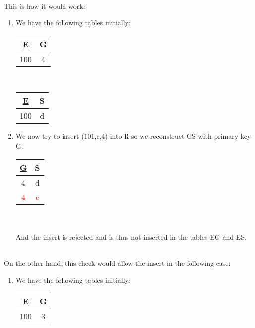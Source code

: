 \documentclass[11pt]{article}
\begin{document}
\begin{enumerate}
    \\ This is how it would work:
    \begin{enumerate}
        \item We have the following tables initially:
        \\
        \begin{tabular}{|c|c|} 
            \hline
            \underline{E} & G \\
            \hline
            100 & 4 \\ 
            \hline
        \end{tabular}
        \ \ \ \ \ \ \ \ \ \ \ \ \ \ \ \ 
        \begin{tabular}{|c|c|} 
            \hline
            \underline{E} & S \\
            \hline
            100 & d \\ 
            \hline
        \end{tabular}
        \item We now try to insert (101,c,4) into R so we reconstruct GS with primary key G.
        \\
        \begin{tabular}{|c|c|} 
            \hline
            \underline{G} & S \\
            \hline
            4 & d \\ 
            \textcolor{red}{4} & \textcolor{red}{c} \\
            \hline
        \end{tabular}
        \\\\ And the insert is rejected and is thus not inserted in the tables EG and ES.     
    \end{enumerate}
    \\ On the other hand, this check would allow the insert in the following case:
    \begin{enumerate}
        \item We have the following tables initially:
        \\
        \begin{tabular}{|c|c|} 
            \hline
            \underline{E} & G \\
            \hline
            100 & 3 \\ 
            \hline
        \end{tabular}
        \ \ \ \ \ \ \ \ \ \ \ \ \ \ \ \ 
        \begin{tabular}{|c|c|} 
            \hline

\end{tabular}
\end{enumerate}
\end{enumerate}
\end{document}

